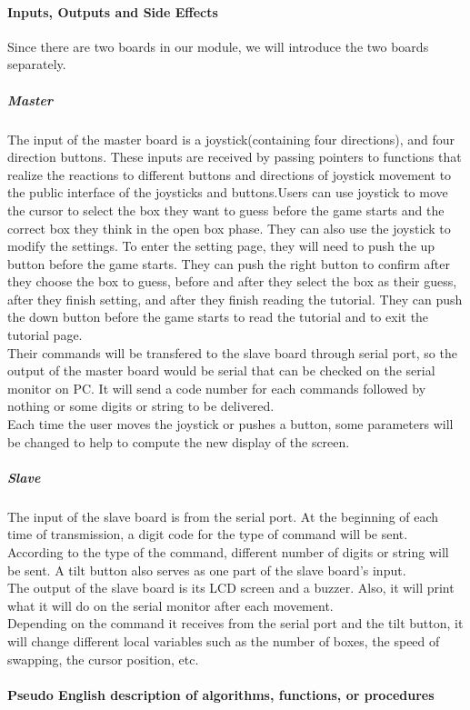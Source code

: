 \paragraph{Inputs, Outputs and Side Effects}
\hfill \newline
Since there are two boards in our module, we will introduce the two boards separately.
\subparagraph{Master}
\hfill \newline
The input of the master board is a joystick(containing four directions), and four direction buttons. These inputs are received by passing pointers to functions that realize the reactions to different buttons and directions of joystick movement to the public interface of the joysticks and buttons.Users can use joystick to move the cursor to select the box they want to guess before the game starts and the correct box they think in the open box phase. They can also use the joystick to modify the settings. To enter the setting page, they will need to push the up button before the game starts. They can push the right button to confirm after they choose the box to guess, before and after they select the box as their guess, after they finish setting, and after they finish reading the tutorial. They can push the down button before the game starts to read the tutorial and to exit the tutorial page. \\
\hfill \newline
Their commands will be transfered to the slave board through serial port, so the output of the master board would be serial that can be checked on the serial monitor on PC. It will send a code number for each commands followed by nothing or some digits or string to be delivered. \\
\hfill \newline
Each time the user moves the joystick or pushes a button, some parameters will be changed to help to compute the new display of the screen.
\subparagraph{Slave}
\hfill \newline
The input of the slave board is from the serial port. At the beginning of each time of transmission, a digit code for the type of command will be sent. According to the type of the command, different number of digits or string will be sent. A tilt button also serves as one part of the slave board's input.\\
\hfill \newline
The output of the slave board is its LCD screen and a buzzer. Also, it will print what it will do on the serial monitor after each movement.\\
\hfill \newline
Depending on the command it receives from the serial port and the tilt button, it will change different local variables such as the number of boxes, the speed of swapping, the cursor position, etc.

\paragraph{Pseudo English description of algorithms, functions, or procedures}
